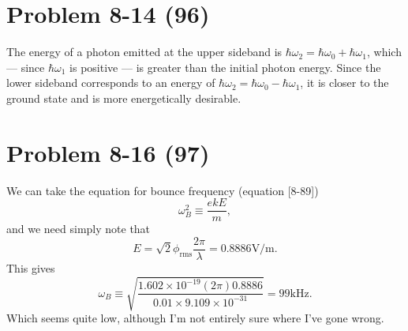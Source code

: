 \section*{Problem 8-14 (96)}
\label{sec:8-14}
The energy of a photon emitted at the upper sideband is \(\hbar\omega_2 = \hbar\omega_0 + \hbar\omega_1 \), which --- since \(\hbar\omega_1 \) is positive --- is greater than the initial photon energy. Since the lower sideband corresponds to an energy of \(\hbar\omega_2 = \hbar\omega_0 - \hbar\omega_1 \), it is closer to the ground state and is more energetically desirable. 

\section*{Problem 8-16 (97)}
\label{sec:8-16}
We can take the equation for bounce frequency (equation [8-89])
\begin{equation*}
	\omega^2_B \equiv \dfrac{ekE}{m},
\end{equation*}
and we need simply note that
\begin{equation*}
	E = \sqrt{2}\phi_{\text{rms}}\dfrac{2\pi}{\lambda} = 0.8886 \text{V/m}.
\end{equation*}
This gives
\begin{equation*}
	\omega_B \equiv \sqrt{\dfrac{1.602\times 10^{-19} (2\pi) 0.8886}{0.01 \times 9.109\times 10^{-31}}} = 99\text{kHz}.
\end{equation*}
Which seems quite low, although I'm not entirely sure where I've gone wrong. 

